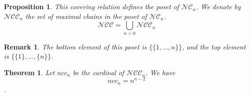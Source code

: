 \documentclass[12pt]{report}
\newtheorem{theorem}{Theorem}
\newtheorem*{prop}{Proposition}
\newtheorem*{rem}{Remark}
\begin{document}
\begin{prop}
    This covering relation defines the \emph{poset}
    of $\mathcal{NC}_n$.
    We denote by $\mathcal{NCC}_n$ the set of
    \emph{maximal chains} in the poset of $\mathcal{NC}_n$.\\
    $$\mathcal{NCC} = \bigcup_{n > 0}{\mathcal{NCC}_n}$$
\end{prop}

\begin{rem}
    The bottom element of this poset is $\{\{1, \ldots, n\}\}$,
    and the top element is $\{\{1\}, \ldots, \{n\}\}$.
\end{rem}

\begin{theorem}
    Let $ncc_n$ be the cardinal of $\mathcal{NCC}_n$.
    We have $$ncc_n = n^{n - 2}$$.
\end{theorem}
\end{document}

